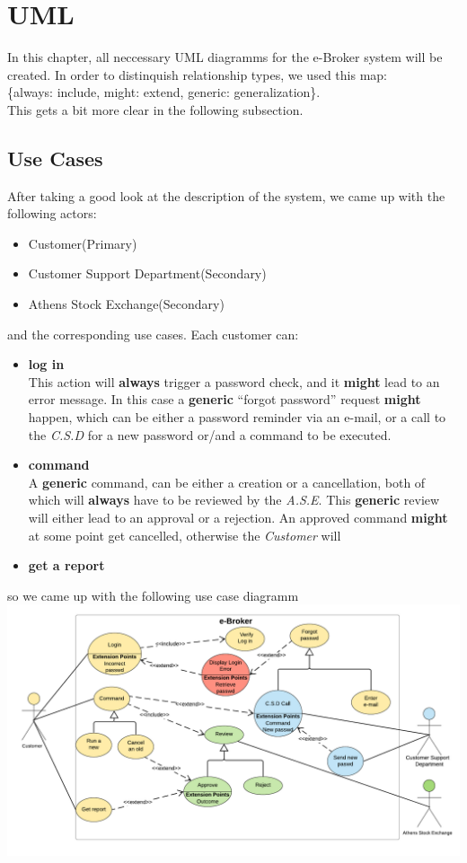 \documentclass{article}
\begin{document}
\newpage
\section{UML}
In this chapter, all neccessary UML diagramms for the e-Broker system will be created. In order to distinquish relationship types, we used this map: \\\hspace*{16mm}\{always: include, might: extend, generic: generalization\}. \\
This gets a bit more clear in the following subsection. 
\subsection{Use Cases}
After taking a good look at the description of the system, we came up with the following actors:
\begin{itemize}
\item Customer(Primary)
\item Customer Support Department(Secondary)
\item Athens Stock Exchange(Secondary)
\end{itemize}
 and the corresponding use cases. Each customer can:
\begin{itemize}
\item \textbf{log in}\\This action will \textbf{always} trigger a password check, and it 
\textbf{might} lead to an error message. In this case a \textbf{generic} ``forgot password'' request \textbf{might} happen, which can be either a password reminder via an e-mail, or a call to the \textit{C.S.D} for a new password or/and a command to be executed.
\item \textbf{command}\\A \textbf{generic} command, can be either a creation or a cancellation, both of which will \textbf{always} have to be reviewed by the \textit{A.S.E}. This \textbf{generic} review will either lead to an approval or a rejection. An approved command \textbf{might} at some point get cancelled, otherwise the \textit{Customer} will 
\item \textbf{get a report}
\end{itemize}
so we came up with the following use case diagramm\\
\includegraphics[scale=0.25]{use_cases}
\end{document}
